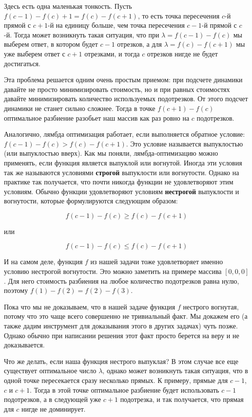 Здесь есть одна маленькая тонкость. Пусть $f(c - 1) - f(c) + 1 = f(c) - f(c + 1)$, то есть точка пересечения $c$-й прямой с $c + 1$-й на единицу больше, чем точка пересечения $c - 1$-й прямой с $c$-й. Тогда может возникнуть такая ситуация, что при $\lambda = f(c - 1) - f(c)$ мы выберем ответ, в котором будет $c - 1$ отрезков, а для $\lambda = f(c) - f(c + 1)$ мы уже выберем ответ с $c + 1$ отрезками, и тогда $c$ отрезков нигде не будет достигаться.

Эта проблема решается одним очень простым приемом: при подсчете динамики давайте не просто минимизировать стоимость, но и при равных стоимостях давайте минимизировать количество используемых подотрезков. От этого подсчет динамики не станет сильно сложнее. Тогда в точке $f(c + 1) - f(c)$ оптимальное разбиение разобьет наш массив как раз ровно на $c$ подотрезков.

Аналогично, лямбда оптимизация работает, если выполняется обратное условие: $f(c - 1) - f(c) > f(c) - f(c + 1)$. Это условие называется выпуклостью (или выпуклостью вверх). Как мы поняли, лямбда-оптимизацию можно применять, если функция является выпуклой или вогнутой. Иногда эти условия так же называются условиями \textbf{строгой} выпуклости или вогнутости. Однако на практике так получается, что почти никогда функции не удовлетворяют этим условиям.
Обычно функции удовлетворяют условиям \textbf{нестрогой} выпуклости и вогнутости, которые формулируются следующим образом:

$$f(c - 1) - f(c) \ge f(c) - f(c + 1)$$

или

$$f(c - 1) - f(c) \le f(c) - f(c + 1)$$

И на самом деле, функция $f$ из нашей задачи тоже удовлетворяет именно условию нестрогой вогнутости. Это можно заметить на примере массива $[0, 0, 0]$. Для него стоимость разбиения на любое количество подотрезков равна нулю, поэтому $f(1) - f(2) = f(2) - f(3)$.

\begin{observation}
    Пока что мы не доказываем, что в нашей задаче функция $f$ нестрого вогнутая, потому что это чаще всего совершенно не тривиальный факт. Мы докажем его (а также дадим инструмент для доказывания этого в других задачах) чуть позже. Однако обычно при написании решения этот факт просто берется на веру и не доказывается.
\end{observation}

Что же делать, если наша функция нестрого выпуклая? В этом случае все еще существует оптимальное число $\lambda$, однако может возникнуть такая ситуация, что в одной точке пересекается сразу несколько прямых. К примеру, прямые для $c - 1$, $c$ и $c + 1$. Тогда в этой точке оптимальное разбиение будет использовать $c - 1$ подотрезков, а в следующей уже $c + 1$ подотрезка, и так получается, что прямая для $c$ нигде не доминирует.


